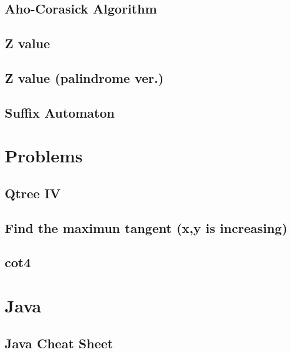 \documentclass[10pt,twocolumn,oneside]{article}
\begin{document}
\subsection{Aho-Corasick Algorithm}


\subsection{Z value}


\subsection{Z value (palindrome ver.)}


\subsection{Suffix Automaton}


\section{Problems}
\subsection {Qtree IV}


\subsection{Find the maximun tangent (x,y is increasing)}


\subsection{cot4}


\section{Java}
\subsection{Java Cheat Sheet}

\end{document}
